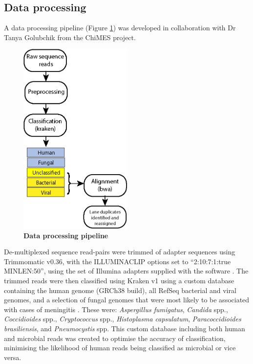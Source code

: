 \subsection{Data processing}
A data processing pipeline (Figure \ref{fig:dataprocessing}) was developed in collaboration with Dr Tanya Golubchik from the ChiMES project. 

\FloatBarrier
\begin{figure}[htbp]
\centering
\includegraphics[width=0.5\textwidth]{./Results1/Images/data-processing.png}
\caption[Data Processing Pipeline]{\textbf{Data processing pipeline}}
\label{fig:dataprocessing}
\end{figure}
\FloatBarrier

De-multiplexed sequence read-pairs were trimmed of adapter sequences using Trimmomatic v0.36, with the ILLUMINACLIP options set to “2:10:7:1:true MINLEN:50”, using the set of Illumina adapters supplied with the software \parencite{Bolger2014}. The trimmed reads were then classified using Kraken v1 \parencite{Wood2014} using a custom database containing the human genome (GRCh38 build), all RefSeq bacterial and viral genomes, and a selection of fungal genomes that were most likely to be associated with cases of meningitis \parencite{Cuomo2017}. These were: \textit{Aspergillus fumigatus}, \textit{Candida} spp., \textit{Coccidioides} spp., \textit{Cryptococcus} spp., \textit{Histoplasma capsulatum}, \textit{Paracoccidioides brasiliensis}, and \textit{Pneumocystis} spp. This custom database including both human and microbial reads was created to optimise the accuracy of classification, minimising the likelihood of human reads being classified as microbial or vice versa.

